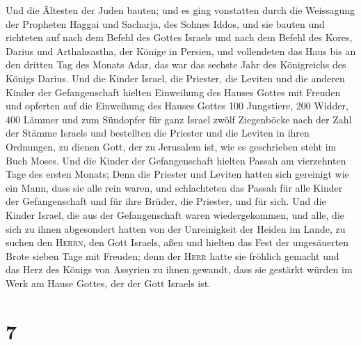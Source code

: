  Und die Ältesten der Juden bauten; und es ging
vonstatten durch die Weissagung der Propheten Haggai und Sacharja, des
Sohnes Iddos, und sie bauten und richteten auf nach dem Befehl des
Gottes Israels und nach dem Befehl des Kores, Darius und Arthahsastha,
der Könige in Persien,  und vollendeten das Haus bis an
den dritten Tag des Monats Adar, das war das sechste Jahr des
Königreichs des Königs Darius.  Und die Kinder Israel,
die Priester, die Leviten und die anderen Kinder der Gefangenschaft
hielten Einweihung des Hauses Gottes mit Freuden  und
opferten auf die Einweihung des Hauses Gottes 100 Jungstiere, 200
Widder, 400 Lämmer und zum Sündopfer für ganz Israel zwölf Ziegenböcke
nach der Zahl der Stämme Israels  und bestellten die
Priester und die Leviten in ihren Ordnungen, zu dienen Gott, der zu
Jerusalem ist, wie es geschrieben steht im Buch Moses. 
Und die Kinder der Gefangenschaft hielten Passah am vierzehnten Tage des
ersten Monats;  Denn die Priester und Leviten hatten sich
gereinigt wie ein Mann, dass sie alle rein waren, und schlachteten das
Passah für alle Kinder der Gefangenschaft und für ihre Brüder, die
Priester, und für sich.  Und die Kinder Israel, die aus
der Gefangenschaft waren wiedergekommen, und alle, die sich zu ihnen
abgesondert hatten von der Unreinigkeit der Heiden im Lande, zu suchen
den \textsc{Herrn}, den Gott Israels, aßen  und hielten
das Fest der ungesäuerten Brote sieben Tage mit Freuden; denn der
\textsc{Herr} hatte sie fröhlich gemacht und das Herz des Königs von
Assyrien zu ihnen gewandt, dass sie gestärkt würden im Werk am Hause
Gottes, der der Gott Israels ist.

\hypertarget{section-6}{%
\section{7}\label{section-6}}

